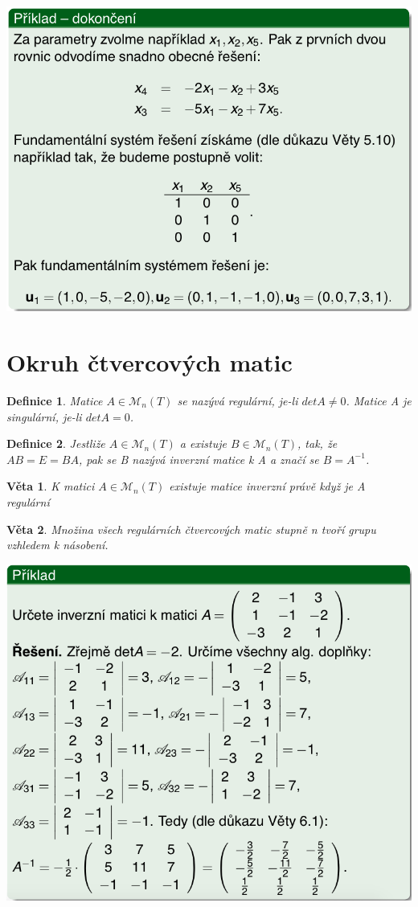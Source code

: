 \documentclass[12pt,a4paper]{article}
\newtheorem{definition}{Definice}
\newtheorem{sentence}{Věta}
\begin{document}
\includegraphics[scale=0.5]{img/LinSoust4}

\section{Okruh čtvercových matic}
\begin{definition}
	Matice $A \in \mathscr{M}_n(T)$ se nazývá regulární, je-li  $detA \not= 0$. Matice A je singulární, je-li $detA = 0$. 
\end{definition}

\begin{definition}
	Jestliže $A \in \mathscr{M}_n(T)$ a existuje $B \in \mathscr{M}_n(T)$, tak, že $AB = E = BA$, pak se B nazývá inverzní matice k A a značí se $B = A^{-1}$.	
\end{definition}

\begin{sentence}
	K matici $A \in \mathscr{M}_n(T)$ existuje matice inverzní právě když je A regulární
\end{sentence}

\begin{sentence}
	Množina všech regulárních čtvercových matic stupně n tvoří grupu vzhledem k násobení.
\end{sentence}

\includegraphics[scale=0.55]{img/InverzniMatice}
\newpage
\end{document}
